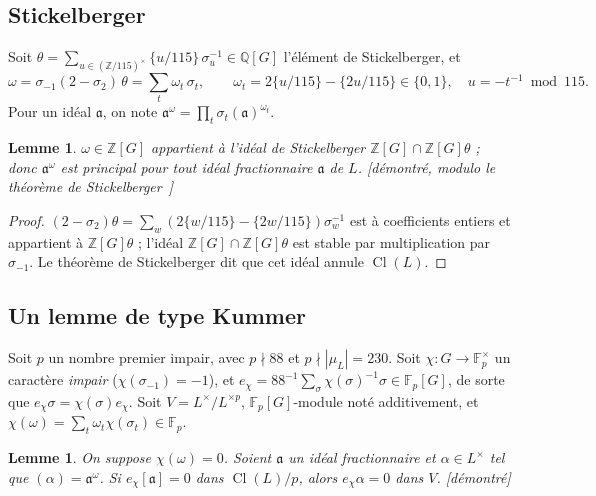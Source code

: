 \documentclass[11pt,a4paper]{amsart}
\theoremstyle{plain}
\newtheorem{lemma}[theorem]{Lemme}
\theoremstyle{definition}
\newcommand{\Q}{\mathbb{Q}}
\newcommand{\Z}{\mathbb{Z}}
\newcommand{\F}{\mathbb{F}}
\newcommand{\aaa}{\mathfrak{a}}
\DeclareMathOperator{\Cl}{Cl}
\newcommand{\st}[1]{\textup{\textsf{\small[#1]}}}
\newcommand{\DEM}{\st{démontré}}
\begin{document}
\subsection{Stickelberger}
Soit $\theta=\sum_{u\in(\Z/115)^\times}\{u/115\}\,\sigma_u^{-1}\in\Q[G]$ l'élément de Stickelberger, et
\[
\omega=\sigma_{-1}(2-\sigma_2)\,\theta=\sum_{t}\omega_t\,\sigma_t,\qquad \omega_t=2\{u/115\}-\{2u/115\}\in\{0,1\},\quad u=-t^{-1}\bmod 115 .
\]
Pour un idéal $\aaa$, on note $\aaa^\omega=\prod_t\sigma_t(\aaa)^{\omega_t}$.

\begin{lemma}\label{lem:stick}
$\omega\in\Z[G]$ appartient à l'idéal de Stickelberger $\Z[G]\cap\Z[G]\theta$ ; donc $\aaa^\omega$ est principal pour tout idéal fractionnaire $\aaa$ de $L$. \st{démontré, modulo le théorème de Stickelberger~\cite[th.~6.10]{Was97}}
\end{lemma}

\begin{proof}
$(2-\sigma_2)\theta=\sum_w(2\{w/115\}-\{2w/115\})\sigma_w^{-1}$ est à coefficients entiers et appartient à $\Z[G]\theta$ ; l'idéal $\Z[G]\cap\Z[G]\theta$ est stable par multiplication par $\sigma_{-1}$. Le théorème de Stickelberger dit que cet idéal annule $\Cl(L)$.
\end{proof}

\subsection{Un lemme de type Kummer}
Soit $p$ un nombre premier impair, avec $p\nmid 88$ et $p\nmid|\mu_L|=230$. Soit $\chi\colon G\to\F_p^\times$ un caractère \emph{impair} ($\chi(\sigma_{-1})=-1$), et $e_\chi=88^{-1}\sum_\sigma\chi(\sigma)^{-1}\sigma\in\F_p[G]$, de sorte que $e_\chi\sigma=\chi(\sigma)e_\chi$. Soit $V=L^\times/L^{\times p}$, $\F_p[G]$-module noté additivement, et $\chi(\omega)=\sum_t\omega_t\chi(\sigma_t)\in\F_p$.

\begin{lemma}\label{lem:kummer}
On suppose $\chi(\omega)=0$. Soient $\aaa$ un idéal fractionnaire et $\alpha\in L^\times$ tel que $(\alpha)=\aaa^\omega$. Si $e_\chi[\aaa]=0$ dans $\Cl(L)/p$, alors $e_\chi\alpha=0$ dans $V$. \DEM
\end{lemma}
\end{document}
